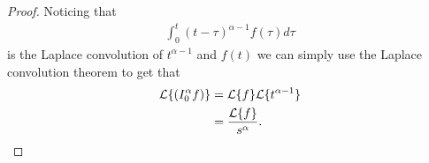 \begin{proof}
    Noticing that 
    \begin{align}
        \int_0^t (t - \tau)^{\alpha - 1} f(\tau) d\tau 
    \end{align}
    is the Laplace convolution of $ t^{\alpha - 1} $ and $ f(t) $ we can simply use the Laplace convolution theorem
    to get that
    \begin{align}
        \mathcal{L}\{ \left( I_{0}^{\alpha} f \right) \} &= \mathcal{L}\{f\} \mathcal{L}\{ t^{\alpha - 1} \} \\
            &= \frac{\mathcal{L}\{f\}}{s^\alpha}.
    \end{align}
\end{proof}

